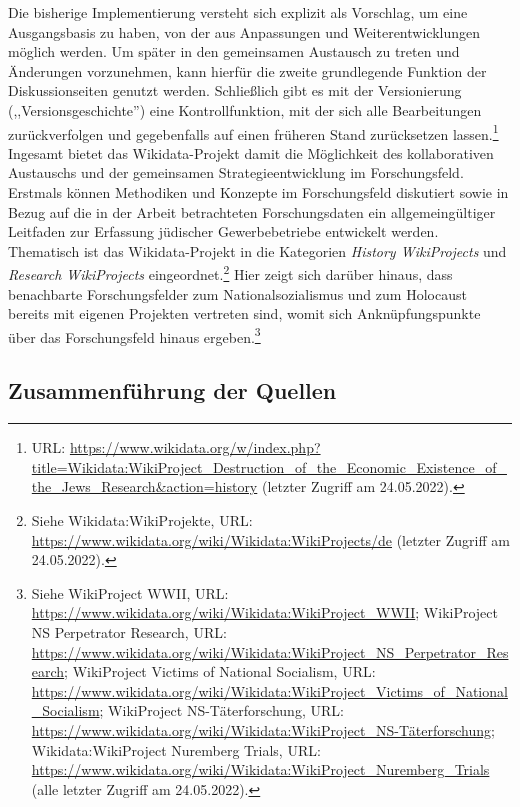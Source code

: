 Die bisherige Implementierung versteht sich explizit als Vorschlag, um eine Ausgangsbasis zu haben, von der aus Anpassungen und Weiterentwicklungen möglich werden. Um später in den gemeinsamen Austausch zu treten und Änderungen vorzunehmen, kann hierfür die zweite grundlegende Funktion der Diskussionseiten genutzt werden. Schließlich gibt es mit der Versionierung (,,Versionsgeschichte'') eine Kontrollfunktion, mit der sich alle Bearbeitungen zurückverfolgen und gegebenfalls auf einen früheren Stand zurücksetzen lassen.\footnote{URL: \url{https://www.wikidata.org/w/index.php?title=Wikidata:WikiProject_Destruction_of_the_Economic_Existence_of_the_Jews_Research&action=history} (letzter Zugriff am 24.05.2022).} Ingesamt bietet das Wikidata-Projekt damit die Möglichkeit des kollaborativen Austauschs und der gemeinsamen Strategieentwicklung im Forschungsfeld. Erstmals können Methodiken und Konzepte im Forschungsfeld diskutiert sowie in Bezug auf die in der Arbeit betrachteten Forschungsdaten ein allgemeingültiger Leitfaden zur Erfassung jüdischer Gewerbebetriebe entwickelt werden. Thematisch ist das Wikidata-Projekt in die Kategorien \textit{History WikiProjects} und \textit{Research WikiProjects} eingeordnet.\footnote{Siehe Wikidata:WikiProjekte, URL: \url{https://www.wikidata.org/wiki/Wikidata:WikiProjects/de} (letzter Zugriff am 24.05.2022).} Hier zeigt sich darüber hinaus, dass benachbarte Forschungsfelder zum Nationalsozialismus und zum Holocaust bereits mit eigenen Projekten vertreten sind, womit sich Anknüpfungspunkte über das Forschungsfeld hinaus ergeben.\footnote{Siehe WikiProject WWII, URL: \url{https://www.wikidata.org/wiki/Wikidata:WikiProject\_WWII}; WikiProject NS Perpetrator Research, URL: \url{https://www.wikidata.org/wiki/Wikidata:WikiProject\_NS\_Perpetrator\_Research}; WikiProject Victims of National Socialism, URL: \url{https://www.wikidata.org/wiki/Wikidata:WikiProject\_Victims\_of\_National\_Socialism}; WikiProject NS-Täterforschung, URL: \url{https://www.wikidata.org/wiki/Wikidata:WikiProject\_NS-Täterforschung}; Wikidata:WikiProject Nuremberg Trials, URL: \url{https://www.wikidata.org/wiki/Wikidata:WikiProject\_Nuremberg\_Trials} (alle letzter Zugriff am 24.05.2022).} 

\subsection{Zusammenführung der Quellen}

